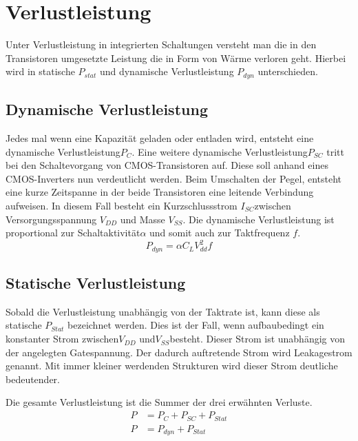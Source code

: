 \section{Verlustleistung}
\label{sec:verlustleistung}
Unter Verlustleistung in integrierten Schaltungen versteht man die in den Transistoren umgesetzte Leistung die in Form von Wärme verloren geht.
Hierbei wird in statische \(P_{stat}\) und dynamische Verlustleistung \(P_{dyn}\) unterschieden. \cite[Seite 4 ff.]{flynn2007low}
\subsection{Dynamische Verlustleistung}\label{subsec:dynVerl}
Jedes mal wenn eine Kapazität geladen oder entladen wird, entsteht eine dynamische Verlustleistung\(P_C\). Eine weitere dynamische Verlustleistung\(P_{SC}\) tritt bei den Schaltevorgang von CMOS-Transistoren auf. Diese soll anhand eines CMOS-Inverters nun verdeutlicht werden. Beim Umschalten der Pegel, entsteht eine kurze Zeitspanne in der beide Transistoren eine leitende Verbindung aufweisen. In diesem Fall besteht ein Kurzschlussstrom \(I_{SC}\)zwischen Versorgungsspannung \(V_{DD}\) und Masse \(V_{SS}\). Die dynamische Verlustleistung ist proportional zur Schaltaktivität\(\alpha\) und somit auch zur Taktfrequenz $f$.\cite[Seite 4 ff.]{flynn2007low}
\begin{equation}
P_{dyn} = \alpha  C_L  V_{dd}^{2}  f
\label{eq:dynVerlustleistung}
\end{equation}
\subsection{Statische Verlustleistung}\label{subsec:statVerl}
Sobald die Verlustleistung unabhängig von der Taktrate ist, kann diese als statische \(P_{Stat}\) bezeichnet werden. Dies ist der Fall, wenn aufbaubedingt ein konstanter Strom zwischen\(V_{DD}\) und\(V_{SS}\)besteht. Dieser Strom ist unabhängig von der angelegten Gatespannung. Der dadurch auftretende Strom wird Leakagestrom genannt. Mit immer kleiner werdenden Strukturen wird dieser Strom deutliche bedeutender.\cite[Seite 8]{flynn2007low}

Die gesamte Verlustleistung ist die Summer der drei erwähnten Verluste.
\begin{equation}
\begin{aligned}
P &= P_{ C }+P_{ SC }+P_{ Stat}\\
P &= P_{dyn}+P_{Stat}
\label{eq:verlustleistung}
\end{aligned}
\end{equation}

